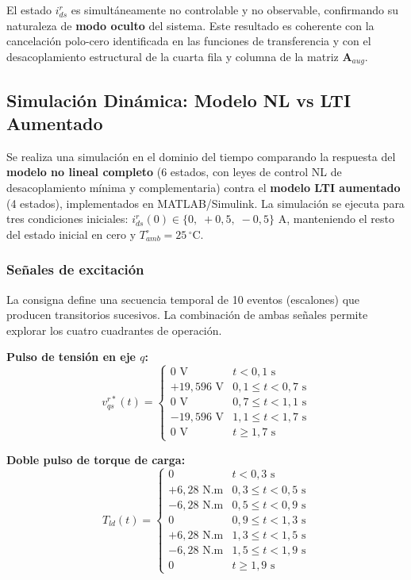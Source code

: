 \documentclass[12pt, a4paper,journal, onecolumn, compsoc]{IEEEtran}
\begin{document}
El estado $i_{ds}^r$ es simultáneamente no controlable y no observable, confirmando su naturaleza de \textbf{modo oculto} del sistema. Este resultado es coherente con la cancelación polo-cero identificada en las funciones de transferencia y con el desacoplamiento estructural de la cuarta fila y columna de la matriz $\bm{A}_{aug}$.

\subsection{Simulación Dinámica: Modelo NL vs LTI Aumentado}
\label{sec:sim_dinamica}

Se realiza una simulación en el dominio del tiempo comparando la respuesta del \textbf{modelo no lineal completo} (6 estados, con leyes de control NL de desacoplamiento mínima y complementaria) contra el \textbf{modelo LTI aumentado} (4 estados), implementados en MATLAB/Simulink. La simulación se ejecuta para tres condiciones iniciales: $i_{ds}^r(0) \in \{0,\; +0{,}5,\; -0{,}5\}$ A, manteniendo el resto del estado inicial en cero y $T_{amb}^\circ = 25\,^\circ$C.

\subsubsection{Señales de excitación}

La consigna define una secuencia temporal de 10 eventos (escalones) que producen transitorios sucesivos. La combinación de ambas señales permite explorar los cuatro cuadrantes de operación.

\textbf{Pulso de tensión en eje $q$:}
\begin{equation}
v_{qs}^{r*}(t) = \begin{cases}
0 \text{ V} & t < 0{,}1 \text{ s} \\
+19{,}596 \text{ V} & 0{,}1 \leq t < 0{,}7 \text{ s} \\
0 \text{ V} & 0{,}7 \leq t < 1{,}1 \text{ s} \\
-19{,}596 \text{ V} & 1{,}1 \leq t < 1{,}7 \text{ s} \\
0 \text{ V} & t \geq 1{,}7 \text{ s}
\end{cases}
\end{equation}

\textbf{Doble pulso de torque de carga:}
\begin{equation}
T_{ld}(t) = \begin{cases}
0 & t < 0{,}3 \text{ s} \\
+6{,}28 \text{ N.m} & 0{,}3 \leq t < 0{,}5 \text{ s} \\
-6{,}28 \text{ N.m} & 0{,}5 \leq t < 0{,}9 \text{ s} \\
0 & 0{,}9 \leq t < 1{,}3 \text{ s} \\
+6{,}28 \text{ N.m} & 1{,}3 \leq t < 1{,}5 \text{ s} \\
-6{,}28 \text{ N.m} & 1{,}5 \leq t < 1{,}9 \text{ s} \\
0 & t \geq 1{,}9 \text{ s}
\end{cases}
\end{equation}
\end{document}
